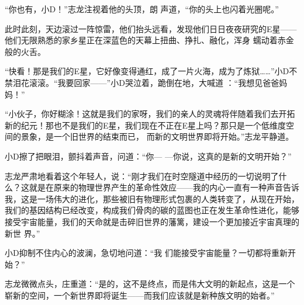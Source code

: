 \documentclass{article}
\begin{document}
“你也有，小D！”志龙注视着他的头顶，朗
声道，“你的头上也闪着光圈呢。” 

此时此刻，天边滚过一阵惊雷，他们抬头远看，发现他们日日夜夜研究的E星——他们无限熟悉的家乡星正在深蓝色的天幕上扭曲、挣扎、融化，浑身
蠕动着赤金般的火舌。 

“快看！那是我们的E星，它好像变得通红，成了一片火海，成为了炼狱……”小D不禁泪花滚滚。“我要回家——”小D哭泣着，跪倒在地，大喊道
：“我想见爸爸妈妈！” 

“小伙子，你好糊涂！这就是我们的家呀，我们的亲人的灵魂将伴随着我们去开拓新的纪元！那也不是我们的E星，我们现在不正在E星上吗？那只是一个低维度空间的景象，是一个旧世界的结束而已，
而新的文明世界即将开始。”志龙平静道。 

\newpage

小D擦了把眼泪，颤抖着声音，问道：“你—
—你说，这真的是新的文明开始？” 

志龙严肃地看着这个年轻人，说：“刚才我们在时空隧道中经历的一切说明了什么？这就是在原来的物理世界产生的革命性效应——我的内心一直有一种声音告诉我，这是一场伟大的进化，那些被旧有物理形式包裹的人类转变了，从现在开始，我们的基因结构已经改变，构成我们骨肉的碳的蓝图也正在发生革命性进化，能够接受宇宙能量，我们的天命就是击碎旧世界的藩篱，建设一个更加接近宇宙真理的新世
界。” 

小D抑制不住内心的波澜，急切地问道：“我
们能接受宇宙能量？一切都将重新开始？” 

志龙微微点头，庄重道：“是的，这不是终点，而是伟大文明的新起点，这是一个崭新的空间，一个新世界即将诞生——而我们应该就是新种族文明的始者。”
\end{document}
